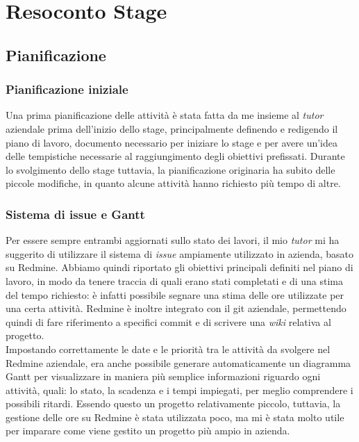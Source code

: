 
\chapter{Resoconto Stage}
\label{cap:resoconto-stage}

\section{Pianificazione}
\subsection{Pianificazione iniziale}\label{sec:pianificazione-iniziale}
Una prima pianificazione delle attività è stata fatta da me insieme al \emph{tutor} aziendale prima dell'inizio dello stage, principalmente definendo e redigendo il piano di lavoro, documento necessario per iniziare lo stage e per avere un'idea delle tempistiche necessarie al raggiungimento degli obiettivi prefissati. Durante lo svolgimento dello stage tuttavia, la pianificazione originaria ha subito delle piccole modifiche, in quanto alcune attività hanno richiesto più tempo di altre. 

\subsection{Sistema di issue e Gantt}
Per essere sempre entrambi aggiornati sullo stato dei lavori, il mio \emph{tutor} mi ha suggerito di utilizzare il sistema di \emph{issue} ampiamente utilizzato in azienda, basato su Redmine. Abbiamo quindi riportato gli obiettivi principali definiti nel piano di lavoro, in modo da tenere traccia di quali erano stati completati e di una stima del tempo richiesto: è infatti possibile segnare una stima delle ore utilizzate per una certa attività. Redmine è inoltre integrato con il git aziendale, permettendo quindi di fare riferimento a specifici commit e di scrivere una \emph{wiki} relativa al progetto.
\\
Impostando correttamente le date e le priorità tra le attività da svolgere nel Redmine aziendale, era anche possibile generare automaticamente un diagramma Gantt per visualizzare in maniera più semplice informazioni riguardo ogni attività, quali: lo stato, la scadenza e i tempi impiegati, per meglio comprendere i possibili ritardi. Essendo questo un progetto relativamente piccolo, tuttavia, la gestione delle ore su Redmine è stata utilizzata poco, ma mi è stata molto utile per imparare come viene gestito un progetto più ampio in azienda.

